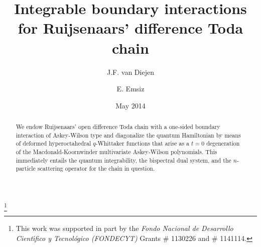 \documentclass[reqno]{amsart}
\theoremstyle{remark}
\numberwithin{equation}{section}
\begin{document}
\title[Boundary interactions for the difference Toda chain]
{Integrable boundary interactions for Ruijsenaars' difference Toda chain}

\author{J.F.  van Diejen}

\address{
Instituto de Matem\'atica y F\'{\i}sica, Universidad de Talca,
Casilla 747, Talca, Chile}


\author{E. Emsiz}

\address{
Facultad de Matem\'aticas, Pontificia Universidad Cat\'olica de Chile,
Casilla 306, Correo 22, Santiago, Chile}


\thanks{This work was supported in part by the {\em Fondo Nacional de Desarrollo
Cient\'{\i}fico y Tecnol\'ogico (FONDECYT)} Grants \# 1130226 and  \# 1141114.}

\date{May 2014}

\begin{abstract}
We endow Ruijsenaars' open difference Toda chain with a one-sided boundary interaction of
Askey-Wilson type and diagonalize the quantum Hamiltonian by means of deformed hyperoctahedral $q$-Whittaker functions that arise as a $t=0$ degeneration of the Macdonald-Koornwinder multivariate Askey-Wilson polynomials.
This immediately entails the quantum integrability,  the bispectral dual system, and the $n$-particle scattering operator for the chain in question.
\end{abstract}

\maketitle
\end{document}
